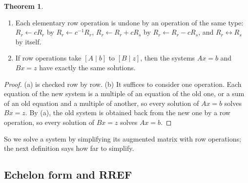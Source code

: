 \documentclass[12pt]{article}
\theoremstyle{definition}
\newtheorem{theorem}{Theorem}
\begin{document}
\begin{theorem}\label{r2-thm-rowops}
\begin{enumerate}
\item Each elementary row operation is undone by an operation of the same type:
\(R_r\leftarrow cR_r\) by \(R_r\leftarrow c^{-1}R_r\), \(R_r\leftarrow R_r+cR_s\) by
\(R_r\leftarrow R_r-cR_s\), and \(R_r\leftrightarrow R_s\) by itself.
\item If row operations take \([A\mid b]\) to \([B\mid z]\), then the systems \(Ax=b\) and
\(Bx=z\) have exactly the same solutions.
\end{enumerate}
\end{theorem}
\begin{proof}
(a) is checked row by row. (b) It suffices to consider one operation. Each equation of the
new system is a multiple of an equation of the old one, or a sum of an old equation and a
multiple of another, so every solution of \(Ax=b\) solves \(Bx=z\). By (a), the old system
is obtained back from the new one by a row operation, so every solution of \(Bx=z\) solves
\(Ax=b\).
\end{proof}
So we solve a system by simplifying its augmented matrix with row operations; the next
definition says how far to simplify.

\subsection*{Echelon form and RREF}
\end{document}
